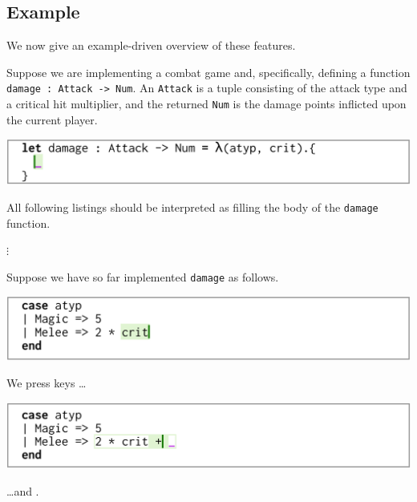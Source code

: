 \documentclass[format=sigplan,dvipsnames,backend=bibtex]{acmart}
\newcommand{\key}[1]{\fbox{\texttt{#1}}}
\begin{document}
\subsection{Example}

We now give an example-driven overview of these features.


Suppose we are implementing a combat game and, specifically, defining a function
	\texttt{damage : Attack -> Num}. An \texttt{Attack} is a tuple consisting of the
	attack type and a critical hit multiplier, and the returned \texttt{Num} is the
	damage points inflicted upon the current player.
	
{\centering
  \includegraphics[width=\linewidth]{fig/context.png}\par
}
\noindent
All following listings should be interpreted as filling the body of the \texttt{damage} function.

{\centering
	\vspace{-0.1cm}
  $\vdots$\par
  \vspace{0.1cm}
}
\noindent
Suppose we have so far implemented \texttt{damage} as follows.

{\centering
  \includegraphics[width=\linewidth]{fig/frame1.png}\par
}
\noindent
We press keys \key{+} \ldots

{\centering
  \includegraphics[width=\linewidth]{fig/frame1-5.png}\par
}
\noindent
\ldots and \key{1}.
\end{document}
